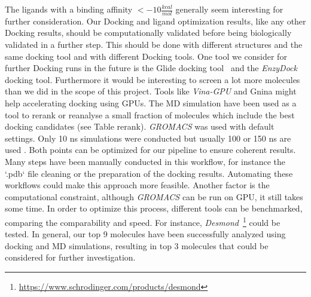 \documentclass[11pt, letterpaper, titlepage]{article}
\begin{document}
The ligands with a binding affinity $< -10 \frac{kcal}{mol}$ generally seem interesting for further consideration. Our Docking and ligand optimization results, like any other Docking results, should be computationally validated before being biologically validated in a further step. This should be done with different structures and the same docking tool and with different Docking tools. One tool we consider for further Docking runs in the future is the Glide docking tool~\cite{Halgren2004} and the \emph{EnzyDock}~\cite{Das2019} docking tool. Furthermore it would be interesting to screen a lot more molecules than we did in the scope of this project. Tools like \emph{Vina-GPU} \cite{Tang_2022} and Gnina \cite{McNutt_2021} might help accelerating docking using GPUs.
\newline \newline
The MD simulation have been used as a tool to rerank or reanalyse a small fraction of molecules which include the best docking candidates (see Table rerank). \emph{GROMACS} was used with default settings. Only 10 ns simulations were conducted but usually 100 or 150 ns are used \cite{El_Hassab_2022}. Both points can be optimized for our pipeline to ensure coherent results. 
\newline \newline
Many steps have been manually conducted in this workflow, for instance the `.pdb` file cleaning or the preparation of the docking results. Automating these workflows could make this approach more feasible. Another factor is the computational constraint, although \emph{GROMACS} can be run on GPU, it still takes some time. In order to optimize this process, different tools can be benchmarked, comparing the comparability and speed. For instance, \emph{Desmond}~\footnote{\url{https://www.schrodinger.com/products/desmond}} could be tested. 
\newline \newline
In general, our top 9 molecules have been successfully analyzed using docking and MD simulations, resulting in top 3 molecules that could be considered for further investigation. 

\pagebreak
\pagebreak
\end{document}
